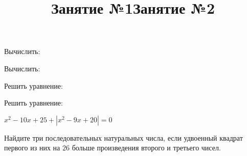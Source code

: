 \title{Занятие №1}
\begin{listofex}
	\item Вычислить:
	\begin{enumcols}[itemcolumns=2]
		\item {}
		\item {}
		\item {}
		\item {}
		\item {}
		\item {}
	\end{enumcols}
	\item Вычислить:
	\begin{enumcols}[itemcolumns=2]
		\item {}
		\item {}
		\item {}
		\item {}
		\item {}
		\item {}
	\end{enumcols}
	\item Решить уравнение:
	\begin{enumcols}[itemcolumns=2]
		\item {}
		\item {}
		\item {}
		\item {}
		\item {}
	\end{enumcols}
	\item Решить уравнение:
	\begin{enumcols}[itemcolumns=2]
		\item {}
		\item {}
		\item {}
		\item \( x^2-10x+25+|x^2-9x+20|=0 \)
	\end{enumcols}
	\item Найдите три последовательных натуральных числа, если удвоенный квадрат
	первого из них на \( 26 \) больше произведения второго и третьего чисел.
\end{listofex}
\newpage
\title{Занятие №2}
